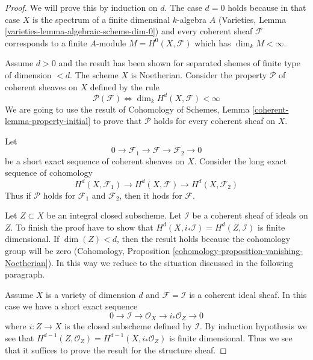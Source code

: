 \begin{proof}
We will prove this by induction on $d$. The case $d = 0$ holds because
in that case $X$ is the spectrum of a finite dimensinal $k$-algebra $A$
(Varieties, Lemma \ref{varieties-lemma-algebraic-scheme-dim-0})
and every coherent sheaf $\mathcal{F}$ corresponds to a finite $A$-module
$M = H^0(X, \mathcal{F})$ which has $\dim_k M < \infty$.

\medskip\noindent
Assume $d > 0$ and the result has been shown for separated shemes
of finite type of dimension $< d$. The scheme $X$ is Noetherian. Consider
the property $\mathcal{P}$ of coherent sheaves on $X$ defined by the rule
$$
\mathcal{P}(\mathcal{F}) \Leftrightarrow
\dim_k H^d(X, \mathcal{F}) < \infty
$$
We are going to use the result of
Cohomology of Schemes, Lemma \ref{coherent-lemma-property-initial}
to prove that $\mathcal{P}$ holds for every coherent sheaf on $X$.

\medskip\noindent
Let
$$
0 \to \mathcal{F}_1 \to \mathcal{F} \to \mathcal{F}_2 \to 0
$$
be a short exact sequence of coherent sheaves on $X$.
Consider the long exact sequence of cohomology
$$
H^d(X, \mathcal{F}_1) \to
H^d(X, \mathcal{F}) \to
H^d(X, \mathcal{F}_2)
$$
Thus if $\mathcal{P}$ holds for $\mathcal{F}_1$ and $\mathcal{F}_2$,
then it hods for $\mathcal{F}$.

\medskip\noindent
Let $Z \subset X$ be an integral closed subscheme. Let $\mathcal{I}$
be a coherent sheaf of ideals on $Z$. To finish the proof have to show
that $H^d(X, i_*\mathcal{I}) = H^d(Z, \mathcal{I})$ is finite dimensional.
If $\dim(Z) < d$, then the result holds because the cohomology group
will be zero (Cohomology, Proposition
\ref{cohomology-proposition-vanishing-Noetherian}).
In this way we reduce to the situation discussed in the following paragraph.

\medskip\noindent
Assume $X$ is a variety of dimension $d$ and 
$\mathcal{F} = \mathcal{I}$ is a coherent ideal sheaf. In this
case we have a short exact sequence
$$
0 \to \mathcal{I} \to \mathcal{O}_X \to i_*\mathcal{O}_Z \to 0
$$
where $i : Z \to X$ is the closed subscheme defined by $\mathcal{I}$.
By induction hypothesis we see that
$H^{d - 1}(Z, \mathcal{O}_Z) = H^{d - 1}(X, i_*\mathcal{O}_Z)$ is
finite dimensional. Thus we see that it suffices to prove the result
for the structure sheaf.


\end{proof}
